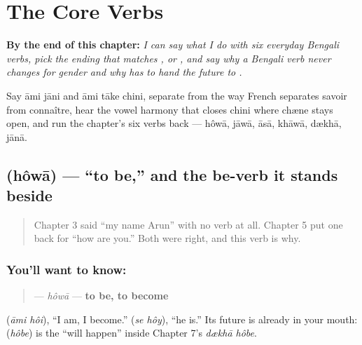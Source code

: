 
\chapter{The Core Verbs}
\label{ch:bn-core-verbs}

\begin{chapteropening}
\textbf{By the end of this chapter:} \emph{I can say what I do with six everyday Bengali verbs, pick the ending that matches ,  or , and say why a Bengali verb never changes for gender and why  has to hand the future to .}

Say āmi jāni and āmi tāke chini, separate  from  the way French separates savoir from connaître, hear the vowel harmony that closes chini where chæne stays open, and run the chapter's six verbs back — hôwā, jāwā, āsā, khāwā, dækhā, jānā.
\end{chapteropening}

\section[\texorpdfstring{\bn{হওয়া} (hôwā)}{হওয়া (hôwā)}]{ (hôwā) — \textquotedblleft{}to be,\textquotedblright{} and the be-verb it stands beside}

\label{lesson:BN-C07-howa}



\begin{quote}
Chapter 3 said \textquotedblleft{}my name Arun\textquotedblright{} with no verb at all. Chapter 5 put one back for \textquotedblleft{}how are you.\textquotedblright{} Both were right, and this verb is why.
\end{quote}

\subsection*{You'll want to know: }
\begin{quote}
\textbf{} — \emph{hôwā} — \textbf{to be, to become}
\end{quote}

  (\emph{āmi hôi}), \textquotedblleft{}I am, I become.\textquotedblright{}   (\emph{se hôy}), \textquotedblleft{}he is.\textquotedblright{} Its future is already in your mouth: \textbf{} (\emph{hôbe}) is the \textquotedblleft{}will happen\textquotedblright{} inside Chapter 7's \emph{dækhā hôbe}.

